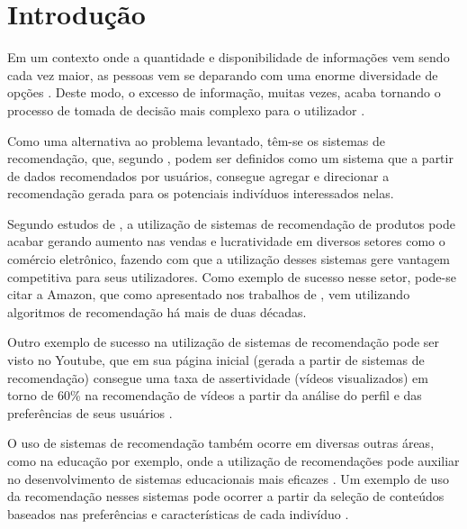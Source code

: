

\setlength{\afterchapskip}{1.5cm minus \baselineskip}


\chapter{Introdução}
\label{cha:introducao}
Em um contexto onde a quantidade e disponibilidade de informações vem sendo cada vez maior, as pessoas vem se deparando com uma enorme diversidade de opções \cite{cazella2010}. Deste modo, o excesso de informação, muitas vezes, acaba tornando o processo de tomada de decisão mais complexo para o utilizador \cite{centeno2018}.

Como uma alternativa ao problema levantado, têm-se os sistemas de recomendação, que, segundo , podem ser definidos como um sistema que a partir de dados recomendados por usuários, consegue agregar e direcionar a recomendação gerada para os potenciais indivíduos interessados nelas.

Segundo estudos de , a utilização de sistemas de recomendação de produtos pode acabar gerando aumento nas vendas e lucratividade em diversos setores como o comércio eletrônico, fazendo com que a utilização desses sistemas gere vantagem competitiva para seus utilizadores. Como exemplo de sucesso nesse setor, pode-se citar a Amazon, que como apresentado nos trabalhos de , vem utilizando algoritmos de recomendação há mais de duas décadas.

Outro exemplo de sucesso na utilização de sistemas de recomendação pode ser visto no Youtube, que em sua página inicial (gerada a partir de sistemas de recomendação) consegue uma taxa de assertividade (vídeos visualizados) em torno de 60\% na recomendação de vídeos a partir da análise do perfil e das preferências de seus usuários \cite{davidson2010youtube}.

O uso de sistemas de recomendação também ocorre em diversas outras áreas, como na educação por exemplo, onde a utilização de recomendações pode auxiliar no desenvolvimento de sistemas educacionais mais eficazes \cite{costa2013sistemas}. Um exemplo de uso da recomendação nesses sistemas pode ocorrer a partir da seleção de conteúdos baseados nas preferências e características de cada indivíduo \cite{adomavicius2005}. 

